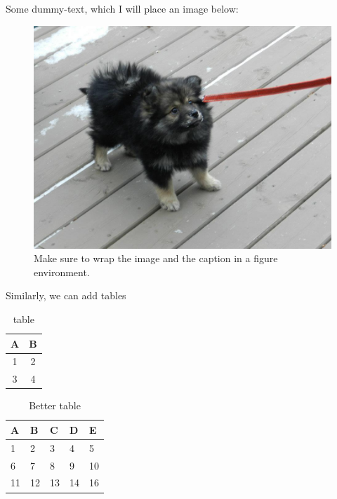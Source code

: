 \documentclass[12pt]{report}
\begin{document}
    Some dummy-text, which I will place an image below:

    \lipsum[1]
    

    \begin{figure}[h!]
        \centering
        \includegraphics[width=\textwidth]{dog}
        \caption{Make sure to wrap the image and the caption in a figure environment.}
        \label{fig:dog}
    \end{figure}


    Similarly, we can add tables
    \begin{table}[h]
        \centering
        \begin{tabular}{|c|c|}
            \hline
            \textbf{A} & \textbf{B}\\
            \hline
            1 & 2 \\
            \hline
            3 & 4 \\
            \hline
        \end{tabular}
        
        \caption{table}
        \label{tab:my_label}
    \end{table}

    \lipsum[1]
    \begin{table}[h]
        \centering
        
        \begin{tabular}{lllll}
            \toprule
            A  & B  & C  & D  & E  \\
            \midrule
            1  & 2  & 3  & 4  & 5  \\
            6  & 7  & 8  & 9  & 10 \\
            11 & 12 & 13 & 14 & 16 \\
            \bottomrule
        \end{tabular}
        
        \caption{Better table}
        \label{tab:better_table}
        
    \end{table}
\end{document}
